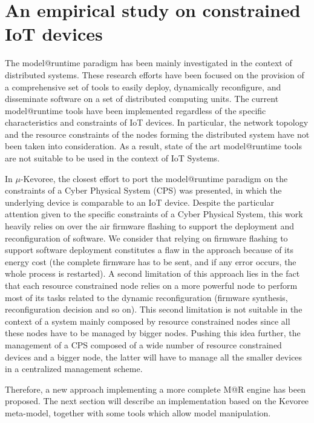 \section{An empirical study on constrained IoT devices}
The model@runtime paradigm has been mainly investigated in the context of distributed systems. 
These research efforts have been focused on the provision of a comprehensive set of tools to easily deploy, dynamically reconfigure, and disseminate software on a set of distributed computing units.
The current model@runtime tools have been implemented regardless of the specific characteristics and constraints of IoT devices.
In particular, the network topology and the resource constraints of the nodes forming the distributed system have not been taken into consideration.
As a result, state of the art model@runtime tools are not suitable to be used in the context of IoT Systems.

In \cite{fouquet2012dynamic} $\mu$-Kevoree, the closest effort to port the model@runtime paradigm on the constraints of a Cyber Physical System (CPS) was presented, in which the underlying device is comparable to an IoT device.
Despite the particular attention given to the specific constraints of a Cyber Physical System, this work heavily relies on over the air firmware flashing to support the deployment and reconfiguration of software. 
We consider that relying on firmware flashing to support software deployment constitutes a flaw in the approach because of its energy cost (the complete firmware has to be sent, and if any error occurs, the whole process is restarted).
A second limitation of this approach lies in the fact that each resource constrained node relies on a more powerful node to perform most of its tasks related to the dynamic reconfiguration (firmware synthesis, reconfiguration decision and so on).
This second limitation is not suitable in the context of a system mainly composed by resource constrained nodes since all these nodes have to be managed by bigger nodes.
Pushing this idea further, the management of a CPS composed of a wide number of resource constrained devices and a bigger node, the latter will have to manage all the smaller devices in a centralized management scheme.

Therefore, a new approach implementing a more complete M@R engine has been proposed.
The next section will describe an implementation based on the Kevoree meta-model, together with some tools which allow model manipulation.

